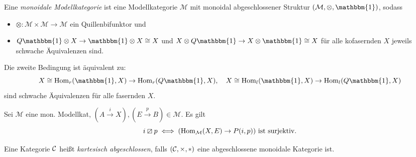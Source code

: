 \documentclass{cheat-sheet}
\newcommand{\lhhe}{\boxslash} %
\newcommand{\ModC}{\mathcal{M}} %
\newcommand{\UnitOb}{\mathbbm{1}} %
\begin{document}
\begin{defn}
  Eine \emph{monoidale Modellkategorie} ist eine Modellkategorie $\ModC$ mit monoidal abgeschlossener Struktur $(\ModC, \otimes, \UnitOb)$, sodass
  \begin{itemize}
    \item $\otimes : \ModC \times \ModC \to \ModC$ ein Quillenbifunktor und
    \item $Q \UnitOb \otimes X \to \UnitOb \otimes X \cong X$ und $X \otimes Q \UnitOb \to X \otimes \UnitOb \cong X$ für alle kofasernden $X$ jeweils schwache Äquivalenzen sind.
  \end{itemize}
\end{defn}

\begin{bem}
  Die zweite Bedingung ist äquivalent zu:
  \[
    X \cong \Hom_r(\UnitOb, X) \to \Hom_r(Q \UnitOb, X), \quad
    X \cong \Hom_l(\UnitOb, X) \to \Hom_l(Q \UnitOb, X)
  \]
  sind schwache Äquivalenzen für alle fasernden $X$.
\end{bem}

\begin{beob}
  Sei $\ModC$ eine mon. Modellkat, $(A \xrightarrow{i} X), (E \xrightarrow{p} B) \in \ModC$.
  Es gilt
  \[ i \lhhe p \iff (\Hom_\ModC(X, E) \to P(i, p)) \text{ ist surjektiv.} \]
\end{beob}


\begin{defn}
  Eine Kategorie $\mathcal{C}$ heißt \emph{kartesisch abgeschlossen}, falls $(\mathcal{C}, \times, *)$ eine abgeschlossene monoidale Kategorie ist.
\end{defn}
\end{document}
